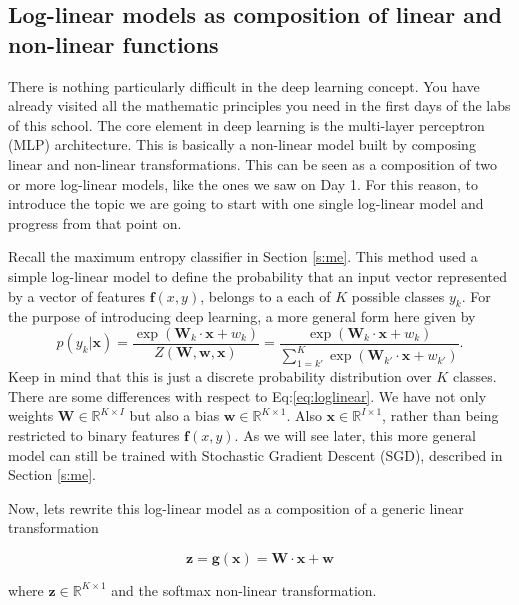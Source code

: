\subsection{Log-linear models as composition of linear and non-linear functions}

There is nothing particularly difficult in the deep learning concept. You have already visited all the mathematic principles you need in the first days of the labs of this school. The core element in deep learning is the multi-layer perceptron (MLP) architecture. This is basically a non-linear model built by composing linear and non-linear transformations. This can be seen as a composition of two or more log-linear models, like the ones we saw on Day 1. For this reason, to introduce the topic we are going to start with one single log-linear model and progress from that point on.

Recall the maximum entropy classifier in Section \ref{s:me}. This method used a simple log-linear model to define the probability that an input vector represented by a vector of features $\boldsymbol{f}(x,y)$, belongs to a each of $K$ possible classes $y_k$. For the purpose of introducing deep learning, a more general form here given by 
%
\begin{equation}
p(y_k|\mathbf{x}) = \frac{\exp(\mathbf{W}_k \cdot \mathbf{x} + w_k)}{Z(\mathbf{W},\mathbf{w},\mathbf{x})} = \frac{\exp(\mathbf{W}_k \cdot \mathbf{x} + w_k)}{\sum_{1=k'}^K \exp(\mathbf{W}_{k'} \cdot \mathbf{x} + w_{k'})}. 
\label{eq:loglineargen}
\end{equation}
%
Keep in mind that this is just a discrete probability distribution over $K$ classes. There are some differences with respect to  Eq:\ref{eq:loglinear}. We have not only weights $\mathbf{W} \in \mathbb{R}^{K \times I}$ but also a bias $\mathbf{w} \in \mathbb{R}^{K \times 1}$. Also $\mathbf{x} \in \mathbb{R}^{I \times 1}$, rather than being restricted to binary features $\boldsymbol{f}(x,y)$. As we will see later, this more general model can still be trained with Stochastic Gradient Descent (SGD), described in Section \ref{s:me}.    

\noindent Now, lets rewrite this log-linear model as a composition of a generic linear transformation 

\begin{equation}
\mathbf{z} = \mathbf{g}(\mathbf{x}) = \mathbf{W} \cdot \mathbf{x} + \mathbf{w}
\label{eq:linear}
\end{equation}

\noindent where $\mathbf{z} \in \mathbb{R}^{K \times 1}$ and the softmax non-linear transformation.

